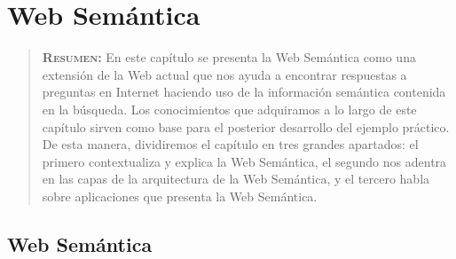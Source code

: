 


\chapter{Web Semántica}
\label{ch:web-semantinca}

\begin{quote}
  {\bf\textsc{Resumen:}} En este capítulo se presenta la Web Semántica como una extensión de la Web actual que nos ayuda a encontrar respuestas a preguntas en Internet haciendo uso de la información semántica contenida en la búsqueda. Los conocimientos que adquiramos a lo largo de este capítulo sirven como base para el posterior desarrollo del ejemplo práctico. De esta manera, dividiremos el capítulo en tres grandes apartados: el primero contextualiza y explica la Web Semántica, el segundo nos adentra en las capas de la arquitectura de la Web Semántica, y el tercero habla sobre aplicaciones que presenta la Web Semántica.
\end{quote}

\section{Web Semántica}

